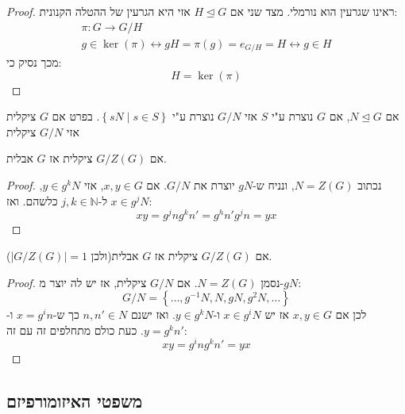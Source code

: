 \documentclass{tstextbook}
\begin{document}
\begin{proof}
ראינו שגרעין הוא נורמלי. מצד שני אם \(H\trianglelefteq G\) אזי
היא הגרעין של ההטלה הקנונית: $$\begin{gathered}\pi:G\to G / H \\g\in \ker\left( \pi \right) \leftrightarrow gH=\pi(g)=e_{G / H}=H \leftrightarrow g\in H
\end{gathered}$$ מכך נסיק כי: $$H=\ker\left( \pi \right)$$

\end{proof}
אם \(N\trianglelefteq G\), אם \(G\) נוצרת ע"י \(S\) אזי \(G / N\) נוצרת ע"י \(\left\{  sN\;|\; s \in S  \right\}\). בפרט אם \(G\) ציקלית אזי \(G / N\) ציקלית

\begin{proposition}
אם \(G / Z(G)\) ציקלית אז \(G\) אבלית.

\end{proposition}
\begin{proof}
נכתוב \(N=Z(G)\), ונניח ש-\(gN\) יוצרת את \(G / N\). אם \(x,y \in G\),
אזי \(y\in g^kN\), \(x \in g^jN\) ל-\(j,k\in \mathbb{N}\) כלשהם. ואז:
$$xy=g^j n g^k n'=g^h n'g^jn=yx$$

\end{proof}
\begin{proposition}
אם \(G/Z(G)\) ציקלית אז \(G\) אבלית(ולכן \(|G/Z(G)|=1\)).

\end{proposition}
\begin{proof}
נסמן \(N=Z(G)\). אם \(G/N\) ציקלית, אז יש לה יוצר מ-\(gN\):
$$G/N=\left\{  \dots,g^{-1} N,N,gN,g^2N, \dots  \right\}$$
לכן אם \(x,y \in G\) אז יש \(x \in g^iN\) ו-\(y\in g^kN\). ואז ישנם \(n,n' \in N\) כך ש-\(x=g^in\) ו-\(y=g^kn'\). כעת כולם מתחלפים זה עם זה: $$xy=g^ing^kn'=yx$$

\end{proof}
\subsection{משפטי האיזומורפיזם}
\end{document}
